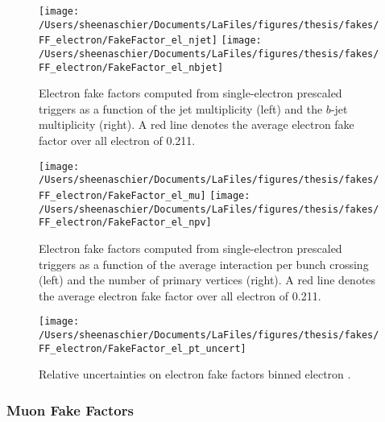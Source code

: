 \documentclass[11pt, oneside]{article}   	%
\begin{document}
\begin{figure}[tbp]
  \centering
  \texttt{[image: /Users/sheenaschier/Documents/LaFiles/figures/thesis/fakes/FF\_electron/FakeFactor\_el\_njet]}
  \texttt{[image: /Users/sheenaschier/Documents/LaFiles/figures/thesis/fakes/FF\_electron/FakeFactor\_el\_nbjet]}\\
  \caption{Electron fake factors computed from single-electron prescaled triggers as a function of the jet multiplicity (left) and the $b$-jet multiplicity (right). A red line denotes the average electron fake factor over all electron \pt{} of 0.211.}
  \label{fig:elec_FF_njet}
\end{figure}


\begin{figure}[tbp]
  \centering
  \texttt{[image: /Users/sheenaschier/Documents/LaFiles/figures/thesis/fakes/FF\_electron/FakeFactor\_el\_mu]}
  \texttt{[image: /Users/sheenaschier/Documents/LaFiles/figures/thesis/fakes/FF\_electron/FakeFactor\_el\_npv]}\\
  \caption{Electron fake factors computed from single-electron prescaled triggers as a function of the average interaction per bunch crossing (left) and the number of primary vertices (right). A red line denotes the average electron fake factor over all electron \pt{} of 0.211.}
  \label{fig:elec_FF_pileup}
\end{figure}

\begin{figure}[tbp]
  \centering
  \texttt{[image: /Users/sheenaschier/Documents/LaFiles/figures/thesis/fakes/FF\_electron/FakeFactor\_el\_pt\_uncert]}\\
  \caption{Relative uncertainties on electron fake factors binned electron \pt{}.}
  \label{fig:elec_FF_rel_uncert}
\end{figure}

 \FloatBarrier
\subsubsection{Muon Fake Factors}
\end{document}
